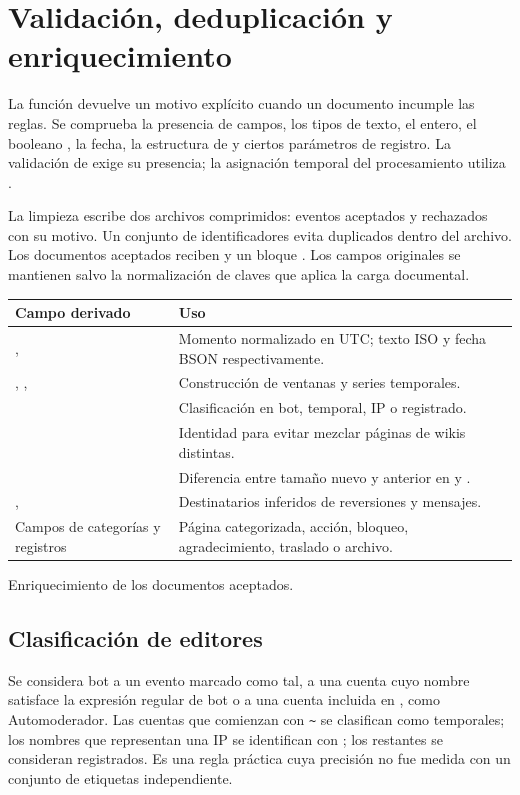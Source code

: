 \section{Validación, deduplicación y enriquecimiento}
La función  devuelve un motivo explícito cuando un documento incumple las reglas. Se comprueba la presencia de campos, los tipos de texto, el  entero, el booleano , la fecha, la estructura de  y ciertos parámetros de registro. La validación de  exige su presencia; la asignación temporal del procesamiento utiliza .

La limpieza escribe dos archivos comprimidos: eventos aceptados y rechazados con su motivo. Un conjunto de identificadores evita duplicados dentro del archivo. Los documentos aceptados reciben  y un bloque . Los campos originales se mantienen salvo la normalización de claves que aplica la carga documental.

\begin{tabla}
\begin{tabularx}{\textwidth}{P{4.0cm}Y}
\toprule
Campo derivado & Uso \\
\midrule
{},  & Momento normalizado en UTC; texto ISO y fecha BSON respectivamente. \\
, ,  & Construcción de ventanas y series temporales. \\
 & Clasificación en bot, temporal, IP o registrado. \\
 & Identidad  para evitar mezclar páginas de wikis distintas. \\
 & Diferencia entre tamaño nuevo y anterior en  y . \\
,  & Destinatarios inferidos de reversiones y mensajes. \\
Campos de categorías y registros & Página categorizada, acción, bloqueo, agradecimiento, traslado o archivo. \\
\bottomrule
\end{tabularx}
\caption{Enriquecimiento de los documentos aceptados.}
\end{tabla}

\subsection{Clasificación de editores}
Se considera bot a un evento marcado como tal, a una cuenta cuyo nombre satisface la expresión regular de bot o a una cuenta incluida en , como Automoderador. Las cuentas que comienzan con \texttt{\textasciitilde} se clasifican como temporales; los nombres que representan una IP se identifican con ; los restantes se consideran registrados. Es una regla práctica cuya precisión no fue medida con un conjunto de etiquetas independiente.

